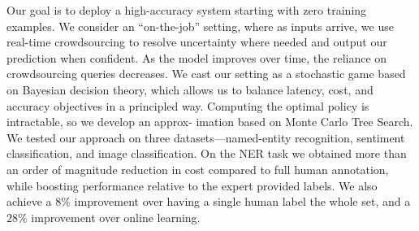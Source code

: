 Our goal is to deploy a high-accuracy system starting with zero training examples.
We consider an “on-the-job” setting, where as inputs arrive, we use real-time crowdsourcing to resolve uncertainty where needed and output our prediction when confident. As the model improves over time, the reliance on crowdsourcing queries
decreases. We cast our setting as a stochastic game based on Bayesian decision
theory, which allows us to balance latency, cost, and accuracy objectives in a principled way. Computing the optimal policy is intractable, so we develop an approx-
imation based on Monte Carlo Tree Search. We tested our approach on three
datasets---named-entity recognition, sentiment classification, and image classification. On the NER task we obtained more than an order of magnitude reduction in cost compared to full
human annotation, while boosting performance relative to the expert provided labels. We also achieve a $8\%$ \fone{} improvement over having a single
human label the whole set, and a $28\%$ \fone{} improvement over online learning.


